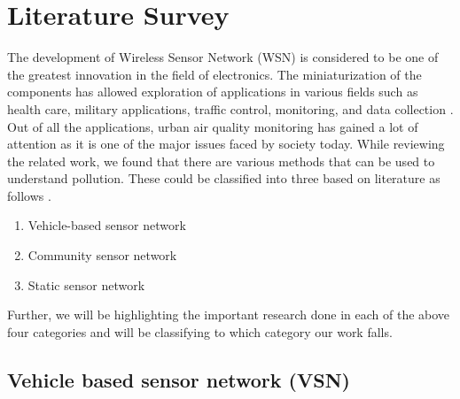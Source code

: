 \chapter{Literature Survey}

The development of Wireless Sensor Network (WSN) is considered to be one of the greatest innovation in the field of electronics. The miniaturization of the components has allowed exploration of applications in various fields such as health care, military applications, traffic control, monitoring, and data collection \cite{Khedo2017} \cite{Liu2017}. Out of all the applications, urban air quality monitoring has gained a lot of attention as it is one of the major issues faced by society today. While reviewing the related work, we found that there are various methods that can be used to understand pollution. These could be classified into three based on literature as follows \cite{Yi2015} \cite{Pavani2017}.




 
\begin{enumerate}

    \item Vehicle-based sensor network
    \item Community sensor network
    \item Static sensor network

 \end{enumerate} 

 Further, we will be highlighting the important research done in each of the above four categories and will be classifying to which category our work falls.

\section{Vehicle based sensor network (VSN)}

